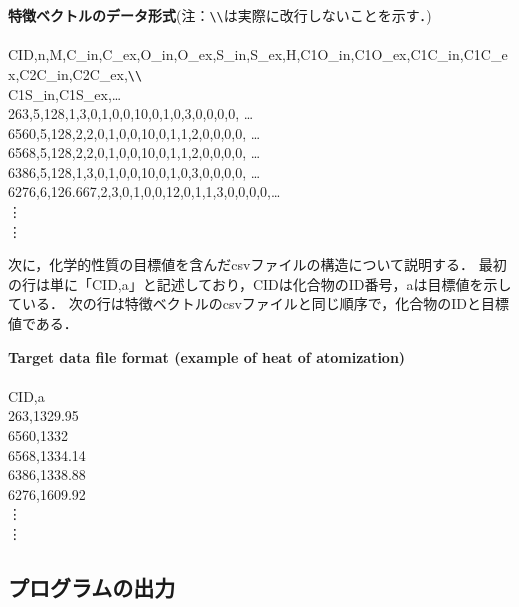 \documentclass[11pt,titlepage,dvipdfmx,twoside]{jarticle}
\begin{document}
\begin{oframed}
{\bf 特徴ベクトルのデータ形式}(注：\verb|\\|は実際に改行しないことを示す．)\\\\
CID,n,M,C\_in,C\_ex,O\_in,O\_ex,S\_in,S\_ex,H,C1O\_in,C1O\_ex,C1C\_in,C1C\_ex,C2C\_in,C2C\_ex,\verb|\\| \\
C1S\_in,C1S\_ex,\ldots \\
263,5,128,1,3,0,1,0,0,10,0,1,0,3,0,0,0,0, \ldots \\
6560,5,128,2,2,0,1,0,0,10,0,1,1,2,0,0,0,0, \ldots \\
6568,5,128,2,2,0,1,0,0,10,0,1,1,2,0,0,0,0, \ldots \\
6386,5,128,1,3,0,1,0,0,10,0,1,0,3,0,0,0,0, \ldots \\
6276,6,126.667,2,3,0,1,0,0,12,0,1,1,3,0,0,0,0,\ldots \\
\hspace{5mm}\vdots
\\
\hspace{5mm}\vdots

\end{oframed}

次に，化学的性質の目標値を含んだcsvファイルの構造について説明する．
最初の行は単に「CID,a」と記述しており，CIDは化合物のID番号，aは目標値を示している．
次の行は特徴ベクトルのcsvファイルと同じ順序で，化合物のIDと目標値である．

\bigskip

\begin{oframed}
{\bf Target data file format (example of heat of atomization)}\\\\
CID,a \\
263,1329.95 \\
6560,1332 \\
6568,1334.14 \\
6386,1338.88 \\
6276,1609.92 \\
\hspace{5mm}\vdots
\\
\hspace{5mm}\vdots

\end{oframed}


\subsection{プログラムの出力}
\label{sec:section3_3}
\end{document}
